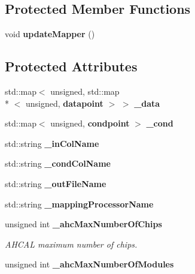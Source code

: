 \subsection*{Protected Member Functions}
\begin{DoxyCompactItemize}
\item 
void {\bfseries update\-Mapper} ()\label{classExtractIntercalibrationProcessor_a032a69f48b6fc244f50a521036c0e70f}

\end{DoxyCompactItemize}
\subsection*{Protected Attributes}
\begin{DoxyCompactItemize}
\item 
std\-::map$<$ unsigned, std\-::map\\*
$<$ unsigned, {\bf datapoint} $>$ $>$ {\bfseries \-\_\-data}\label{classExtractIntercalibrationProcessor_adf4e67f38b5b2e34e362fc2a03ed26f2}

\item 
std\-::map$<$ unsigned, {\bf condpoint} $>$ {\bfseries \-\_\-cond}\label{classExtractIntercalibrationProcessor_af577a1ce16643b016b6f8fda558f569b}

\item 
std\-::string {\bfseries \-\_\-in\-Col\-Name}\label{classExtractIntercalibrationProcessor_a19f78bf996da661aebc1b2c206e50d22}

\item 
std\-::string {\bfseries \-\_\-cond\-Col\-Name}\label{classExtractIntercalibrationProcessor_a9e1ab65990412e158f8fccd23b63bc6a}

\item 
std\-::string {\bfseries \-\_\-out\-File\-Name}\label{classExtractIntercalibrationProcessor_a40723d9a2fbb028cea27a2bf99f35109}

\item 
std\-::string {\bfseries \-\_\-mapping\-Processor\-Name}\label{classExtractIntercalibrationProcessor_a61d61974a24f4cdd95599200e6c72d24}

\item 
unsigned int {\bf \-\_\-ahc\-Max\-Number\-Of\-Chips}\label{classExtractIntercalibrationProcessor_ac5ad5bc2591002484d190cbe7c4934df}

\begin{DoxyCompactList}\small\item\em A\-H\-C\-A\-L maximum number of chips. \end{DoxyCompactList}\item 
unsigned int {\bf \-\_\-ahc\-Max\-Number\-Of\-Modules}\label{classExtractIntercalibrationProcessor_af129cc6d6cd213cbab068f478e706b94}


\end{DoxyCompactItemize}
